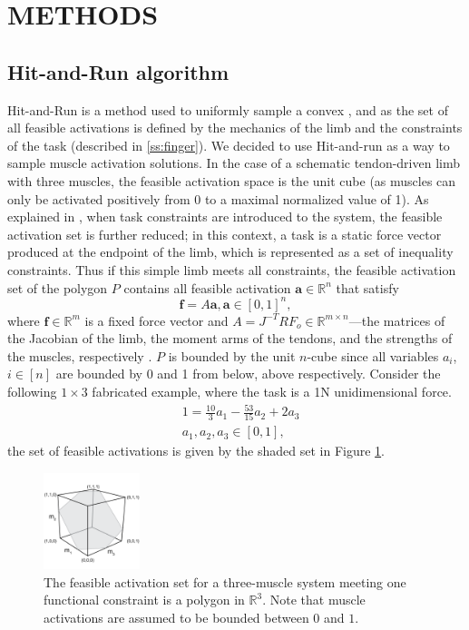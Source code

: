 \section{METHODS}

\subsection{Hit-and-Run algorithm}
Hit-and-Run is a method used to uniformly sample a convex \cite{smith1984efficient}, and as the set of all feasible activations is defined by the mechanics of the limb and the constraints of the task (described in \ref{ss:finger}). 
We decided to use Hit-and-run as a way to sample muscle activation solutions. 
In the case of a schematic tendon-driven limb with three muscles, the feasible activation space is the unit cube (as muscles can only be activated positively from 0 to a maximal normalized value of 1). As explained in \cite{Valero-Cuevas2009mathematical}, when task constraints are introduced to the system, the feasible activation set is further reduced; in this context, a task is a static force vector produced at the endpoint of the limb, which is represented as a set of inequality constraints. Thus if this simple limb meets all constraints, the feasible activation set of the polygon $P$ contains all feasible activation  $\textbf{a} \in \mathbb{R}^n$ that satisfy
\[\textbf{f} = A\textbf{a}, \textbf{a} \in [0,1]^n,\]
where $\textbf{f} \in \mathbb{R}^m$ is a fixed force vector and $A = J^{-T}RF_o \in \mathbb{R}^{m \times n}$---the matrices of the Jacobian of the limb, the moment arms of the tendons, and the strengths of the muscles, respectively \cite{Valero-Cuevas1998Large,Valero-Cuevas2009mathematical}. $P$ is bounded by the unit $n$-cube since all variables $a_i$, $i \in [n]$ are bounded by 0 and 1 from below, above respectively.
Consider the following $1 \times 3$ fabricated example, where the task is a 1N unidimensional force.
\begin{align*}
&1 = \frac{10}{3}a_1 - \frac{53}{15}a_2 + 2a_3 \\
&a_1, a_2, a_3 \in [0,1],
\end{align*}
the set of feasible activations is given by the shaded set in Figure \ref{fig:fig_hr}.

\begin{figure}[ht]
  \label{fig:fig_hr}
   \begin{center}
    \includegraphics[width=0.25\textwidth]{sections/figs/feasibleactivation.png}
  \end{center}
  \caption{The feasible activation set for a  three-muscle system meeting one functional constraint is a polygon in $\mathbb{R}^3$. Note that muscle activations are assumed to be bounded between $0$ and $1$.}

\end{figure}

